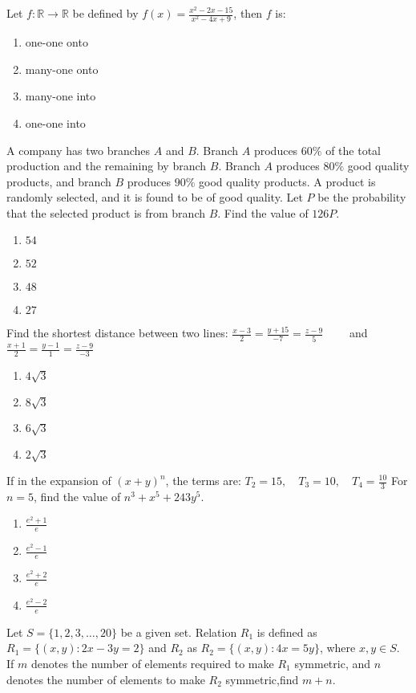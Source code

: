 \item Let $f : \mathbb{R} \to \mathbb{R}$ be defined by $f(x) = \frac{x^2 - 2x - 15}{x^2 - 4x + 9}$, then $f$ is:
    \begin{enumerate}
        \item one-one onto
        \item many-one onto
        \item many-one into
        \item one-one into
    \end{enumerate}
\item A company has two branches $A$ and $B$. Branch $A$ produces $60\%$ of the total production and the remaining by branch $B$. Branch $A$ produces $80\%$ good quality products, and branch $B$ produces $90\%$ good quality products. A product is randomly selected, and it is found to be of good quality. Let $P$ be the probability that the selected product is from branch $B$. Find the value of $126P$.
\begin{enumerate}
    \item $54$
    \item $52$
    \item $48$
    \item $27$
\end{enumerate}
\item Find the shortest distance between two lines:
$\frac{x - 3}{2} = \frac{y + 15}{-7} = \frac{z - 9}{5}\quad \quad$ and $\frac{x + 1}{2} = \frac{y - 1}{1} = \frac{z-9}{-3}$
\begin{enumerate}
    \item $4 \sqrt{3}$
    \item $8 \sqrt{3}$
    \item $6 \sqrt{3}$
    \item $2 \sqrt{3}$
\end{enumerate}
\item If in the expansion of  $(x + y)^n$, the terms are:
$T_2 = 15, \quad T_3 = 10, \quad T_4 = \frac{10}{3}$ For $n = 5$,  find the value of  $n^3+x^5+243y^5$.
\begin{enumerate}
    \item $ \frac{e^2 + 1}{e} $
    \item $ \frac{e^2 - 1}{e} $
    \item $ \frac{e^2 + 2}{e} $
    \item $ \frac{e^2 - 2}{e} $
\end{enumerate}
\item Let $S = \{1, 2, 3, \dots, 20\}$ be a given set. Relation $R_1$ is defined as $R_1 = \{(x, y) : 2x - 3y = 2\}$ and $R_2$ as $R_2 = \{(x, y) : 4x = 5y\}$, where $x, y \in S$. If $m$ denotes the number of elements required to make $R_1$ symmetric, and $n$ denotes the number of elements to make $R_2$ symmetric,find $m+n$.
